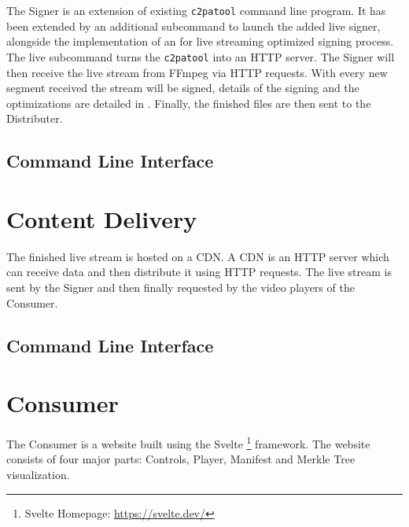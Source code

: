 The Signer is an extension of existing \texttt{c2patool} command line program. It has been extended by an additional subcommand to launch the added live signer, alongside the implementation of an for live streaming optimized signing process. The live subcommand turns the \texttt{c2patool} into an HTTP server. The Signer will then receive the live stream from FFmpeg via HTTP requests. With every new segment received the stream will be signed, details of the signing and the optimizations are detailed in . Finally, the finished files are then sent to the Distributer.

\subsection{Command Line Interface\label{sec:cli_signer}}


\section{Content Delivery\label{sec:cdn}}

The finished live stream is hosted on a CDN. A CDN is an HTTP server which can receive data and then distribute it using HTTP requests. The live stream is sent by the Signer and then finally requested by the video players of the Consumer.


\subsection{Command Line Interface\label{sec:cli_cdn}}


\section{Consumer\label{sec:consumer}}

The Consumer is a website built using the Svelte \footnote{Svelte Homepage: \url{https://svelte.dev/}} framework. The website consists of four major parts: Controls, Player, Manifest and Merkle Tree visualization.


